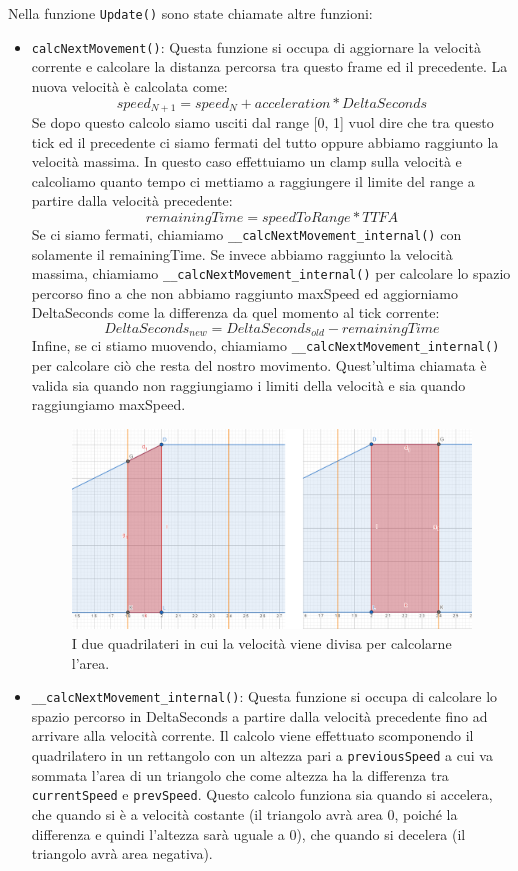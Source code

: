 \documentclass[main.tex]{subfiles}
\begin{document}
Nella funzione \lstinline{Update()} sono state chiamate altre funzioni:
\begin{itemize}
    \item \lstinline{calcNextMovement()}: Questa funzione si occupa di aggiornare la velocità corrente e calcolare la distanza percorsa tra questo frame ed il precedente. La nuova velocità è calcolata come:
    \[speed_{N+1} = speed_{N} + acceleration * DeltaSeconds\]
    Se dopo questo calcolo siamo usciti dal range [0, 1] vuol dire che tra questo tick ed il precedente ci siamo fermati del tutto oppure abbiamo raggiunto la velocità massima. In questo caso effettuiamo un clamp sulla velocità e calcoliamo quanto tempo ci mettiamo a raggiungere il limite del range a partire dalla velocità precedente:
    \[remainingTime = speedToRange * TTFA\]
    Se ci siamo fermati, chiamiamo \lstinline{__calcNextMovement_internal()} con solamente il remainingTime. Se invece abbiamo raggiunto la velocità massima, chiamiamo \lstinline{__calcNextMovement_internal()} per calcolare lo spazio percorso fino a che non abbiamo raggiunto maxSpeed ed aggiorniamo DeltaSeconds come la differenza da quel momento al tick corrente:
    \[DeltaSeconds_{new} = DeltaSeconds_{old} - remainingTime\]
    Infine, se ci stiamo muovendo, chiamiamo \lstinline{__calcNextMovement_internal()} per calcolare ciò che resta del nostro movimento. Quest'ultima chiamata è valida sia quando non raggiungiamo i limiti della velocità e sia quando raggiungiamo maxSpeed.
    \begin{figure}[H]
        \centering
        \includegraphics[width=.8\linewidth]{img/interpolazione/calcNextMovementLateCall.png}
        \caption{I due quadrilateri in cui la velocità viene divisa per calcolarne l'area.}
        \label{fig:4_calcNextMovementLateCall}
    \end{figure}
    \item \lstinline{__calcNextMovement_internal()}: Questa funzione si occupa di calcolare lo spazio percorso in DeltaSeconds a partire dalla velocità precedente fino ad arrivare alla velocità corrente. Il calcolo viene effettuato scomponendo il quadrilatero in un rettangolo con un altezza pari a \lstinline{previousSpeed} a cui va sommata l'area di un triangolo che come altezza ha la differenza tra \lstinline{currentSpeed} e \lstinline{prevSpeed}. Questo calcolo funziona sia quando si accelera, che quando si è a velocità costante (il triangolo avrà area 0, poiché la differenza e quindi l'altezza sarà uguale a 0), che quando si decelera (il triangolo avrà area negativa).

\end{itemize}
\end{document}
